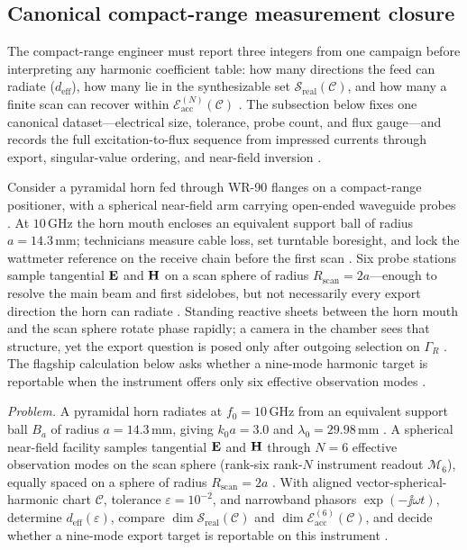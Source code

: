 \subsection{Canonical compact-range measurement closure}
\label{sec:ch4100}
The compact-range engineer must report three integers from one campaign before interpreting any harmonic coefficient table: how many directions the feed can radiate ($d_{\mathrm{eff}}$), how many lie in the synthesizable set $\mathcal{S}_{\mathrm{real}}(\mathcal{C})$, and how many a finite scan can recover within $\mathcal{E}_{\mathrm{acc}}^{(N)}(\mathcal{C})$ \cite{hansen1988}. The subsection below fixes one canonical dataset---electrical size, tolerance, probe count, and flux gauge---and records the full excitation-to-flux sequence from impressed currents through export, singular-value ordering, and near-field inversion \cite{harrington2001}.
\begin{physicalvignette}
Consider a pyramidal horn fed through WR-90 flanges on a compact-range positioner, with a spherical near-field arm carrying open-ended waveguide probes \cite{hansen1988}. At $10\,\mathrm{GHz}$ the horn mouth encloses an equivalent support ball of radius $a=14.3\,\mathrm{mm}$; technicians measure cable loss, set turntable boresight, and lock the wattmeter reference on the receive chain before the first scan \cite{stratton1941}. Six probe stations sample tangential $\mathbf{E}$ and $\mathbf{H}$ on a scan sphere of radius $R_{\mathrm{scan}}=2a$---enough to resolve the main beam and first sidelobes, but not necessarily every export direction the horn can radiate \cite{hansen1988}.
Standing reactive sheets between the horn mouth and the scan sphere rotate phase rapidly; a camera in the chamber sees that structure, yet the export question is posed only after outgoing selection on $\Gamma_{R}$ \cite{jackson1999}. The flagship calculation below asks whether a nine-mode harmonic target is reportable when the instrument offers only six effective observation modes \cite{devaney2004}.
\end{physicalvignette}
\emph{Problem.} A pyramidal horn radiates at $f_{0}=10\,\mathrm{GHz}$ from an equivalent support ball $B_{a}$ of radius $a=14.3\,\mathrm{mm}$, giving $k_{0}a=3.0$ and $\lambda_{0}=29.98\,\mathrm{mm}$ . A spherical near-field facility samples tangential $\mathbf{E}$ and $\mathbf{H}$ through $N=6$ effective observation modes on the scan sphere (rank-six rank-$N$ instrument readout $\mathcal{M}_6$), equally spaced on a sphere of radius $R_{\mathrm{scan}}=2a$ . With aligned vector-spherical-harmonic chart $\mathcal{C}$, tolerance $\varepsilon=10^{-2}$, and narrowband phasors $\exp(-\jj\omega t)$, determine $d_{\mathrm{eff}}(\varepsilon)$, compare $\dim\mathcal{S}_{\mathrm{real}}(\mathcal{C})$ and $\dim\mathcal{E}_{\mathrm{acc}}^{(6)}(\mathcal{C})$, and decide whether a nine-mode export target is reportable on this instrument .

